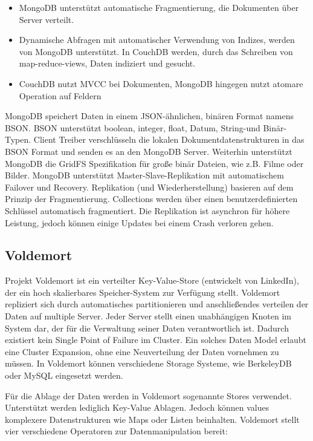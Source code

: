 \begin{itemize}

	\item MongoDB unterstützt automatische Fragmentierung, die Dokumenten über Server verteilt.
	\item Dynamische Abfragen mit automatischer Verwendung von Indizes, werden von MongoDB unterstützt. In CouchDB werden, durch das Schreiben von map-reduce-views, Daten indiziert und gesucht.
	\item CouchDB nutzt MVCC bei Dokumenten, MongoDB hingegen nutzt atomare Operation auf Feldern    

\end{itemize}

MongoDB speichert Daten in einem JSON-ähnlichen, binären Format namens BSON. BSON unterstützt boolean, integer, float, Datum, String-und Binär-Typen. Client Treiber verschlüsseln die lokalen Dokumentdatenstrukturen in das BSON Format und senden es an den MongoDB Server. Weiterhin unterstützt MongoDB die GridFS Spezifikation für große binär Dateien, wie z.B. Filme oder Bilder. MongoDB unterstützt Master-Slave-Replikation mit automatischem Failover und Recovery. Replikation (und Wiederherstellung) basieren auf dem Prinzip der Fragmentierung. Collections werden über einen benutzerdefinierten Schlüssel automatisch fragmentiert. Die Replikation ist asynchron für höhere Leistung, jedoch können einige Updates bei einem Crash verloren gehen. 

\subsection{Voldemort}
\label{ch:AnalyseDatenbanken:sec:Datenbanken:subsec:Voldemort}

Projekt Voldemort \cite{vod2013} ist ein verteilter Key-Value-Store (entwickelt von LinkedIn), der ein hoch skalierbares Speicher-System zur Verfügung stellt. Voldemort repliziert sich durch automatisches partitionieren und anschließendes verteilen der Daten auf multiple Server. Jeder Server stellt einen unabhängigen Knoten im System dar, der für die Verwaltung seiner Daten verantwortlich ist. Dadurch existiert kein Single Point of Failure im Cluster. Ein solches Daten Model erlaubt eine Cluster Expansion, ohne eine Neuverteilung der Daten vornehmen zu müssen. In Voldemort können verschiedene Storage Systeme, wie BerkeleyDB oder MySQL eingesetzt werden. 

Für die Ablage der Daten werden in Voldemort sogenannte Stores verwendet. Unterstützt werden lediglich Key-Value Ablagen. Jedoch können values komplexere Datenstrukturen wie Maps oder Listen beinhalten. Voldemort stellt vier verschiedene Operatoren zur Datenmanipulation bereit:

